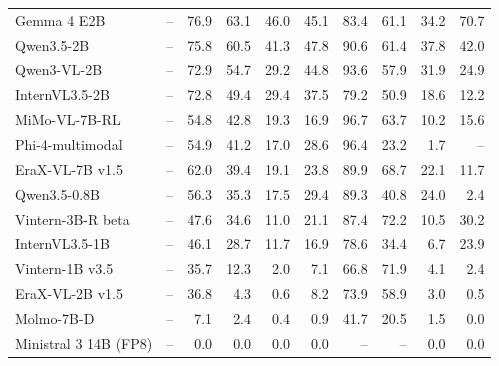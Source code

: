 \begin{table}[t]
\begin{tabular}{lrrrrrrrrr}
Gemma 4 E2B & – & 76.9 & 63.1 & 46.0 & 45.1 & 83.4 & 61.1 & 34.2 & 70.7 \\
Qwen3.5-2B & – & 75.8 & 60.5 & 41.3 & 47.8 & 90.6 & 61.4 & 37.8 & 42.0 \\
Qwen3-VL-2B & – & 72.9 & 54.7 & 29.2 & 44.8 & 93.6 & 57.9 & 31.9 & 24.9 \\
InternVL3.5-2B & – & 72.8 & 49.4 & 29.4 & 37.5 & 79.2 & 50.9 & 18.6 & 12.2 \\
MiMo-VL-7B-RL & – & 54.8 & 42.8 & 19.3 & 16.9 & 96.7 & 63.7 & 10.2 & 15.6 \\
Phi-4-multimodal & – & 54.9 & 41.2 & 17.0 & 28.6 & 96.4 & 23.2 & 1.7 & – \\
EraX-VL-7B v1.5 & – & 62.0 & 39.4 & 19.1 & 23.8 & 89.9 & 68.7 & 22.1 & 11.7 \\
Qwen3.5-0.8B & – & 56.3 & 35.3 & 17.5 & 29.4 & 89.3 & 40.8 & 24.0 & 2.4 \\
Vintern-3B-R beta & – & 47.6 & 34.6 & 11.0 & 21.1 & 87.4 & 72.2 & 10.5 & 30.2 \\
InternVL3.5-1B & – & 46.1 & 28.7 & 11.7 & 16.9 & 78.6 & 34.4 & 6.7 & 23.9 \\
Vintern-1B v3.5 & – & 35.7 & 12.3 & 2.0 & 7.1 & 66.8 & 71.9 & 4.1 & 2.4 \\
EraX-VL-2B v1.5 & – & 36.8 & 4.3 & 0.6 & 8.2 & 73.9 & 58.9 & 3.0 & 0.5 \\
Molmo-7B-D & – & 7.1 & 2.4 & 0.4 & 0.9 & 41.7 & 20.5 & 1.5 & 0.0 \\
Ministral 3 14B (FP8) & – & 0.0 & 0.0 & 0.0 & 0.0 & – & – & 0.0 & 0.0 \\
\bottomrule
\end{tabular}
\par{}
\end{table}
